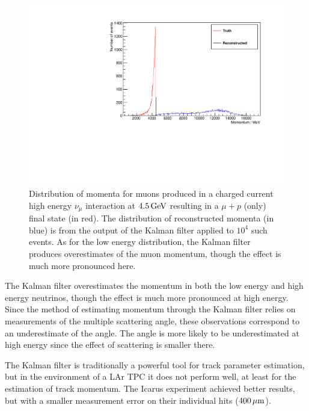 \begin{figure}
\centering
\includegraphics[angle=-90,width=\textwidth]{chapters/trackfitting_images/kalman-ccqe-high}
\caption[True and reconstructed muon momentum distributions for $E_\nu=4.5\GeV$]{\label{fig:kalman-ccqe-high}Distribution of momenta for muons produced in a charged current high energy $\nu_\mu$ interaction at $4.5\,\mathrm{GeV}$ resulting in a $\mu + p$ (only) final state (in red). The distribution of reconstructed momenta (in blue) is from the output of the Kalman filter applied to $10^4$ such events. As for the low energy distribution, the Kalman filter produces overestimates of the muon momentum, though the effect is much more pronounced here.}
\end{figure}

The Kalman filter overestimates the momentum in both the low energy and high energy neutrinos, though the effect is much more pronounced at high energy. Since the method of estimating momentum through the Kalman filter relies on measurements of the multiple scattering angle, these observations correspond to an underestimate of the angle. The angle is more likely to be underestimated at high energy since the effect of scattering is smaller there.

The Kalman filter is traditionally a powerful tool for track parameter estimation, but in the environment of a \ac{LAr TPC} it does not perform well, at least for the estimation of track momentum. The Icarus experiment achieved better results, but with a smaller measurement error on their individual hits ($400\,\mu\mathrm{m}$)\citep{Ankowski2006}.
